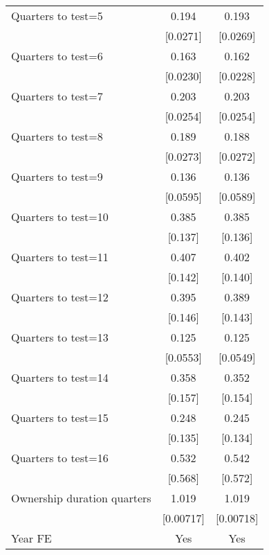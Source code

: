 \begin{longtable}{lcc}
Quarters to test=5  &       0.194\sym{***}&       0.193\sym{***}\tabularnewline
                    &    [0.0271]         &    [0.0269]         \tabularnewline
 
Quarters to test=6  &       0.163\sym{***}&       0.162\sym{***}\tabularnewline
                    &    [0.0230]         &    [0.0228]         \tabularnewline
 
Quarters to test=7  &       0.203\sym{***}&       0.203\sym{***}\tabularnewline
                    &    [0.0254]         &    [0.0254]         \tabularnewline
 
Quarters to test=8  &       0.189\sym{***}&       0.188\sym{***}\tabularnewline
                    &    [0.0273]         &    [0.0272]         \tabularnewline
 
Quarters to test=9  &       0.136\sym{***}&       0.136\sym{***}\tabularnewline
                    &    [0.0595]         &    [0.0589]         \tabularnewline
 
Quarters to test=10 &       0.385\sym{**} &       0.385\sym{**} \tabularnewline
                    &     [0.137]         &     [0.136]         \tabularnewline
 
Quarters to test=11 &       0.407\sym{*}  &       0.402\sym{**} \tabularnewline
                    &     [0.142]         &     [0.140]         \tabularnewline
 
Quarters to test=12 &       0.395\sym{*}  &       0.389\sym{*}  \tabularnewline
                    &     [0.146]         &     [0.143]         \tabularnewline
 
Quarters to test=13 &       0.125\sym{***}&       0.125\sym{***}\tabularnewline
                    &    [0.0553]         &    [0.0549]         \tabularnewline
 
Quarters to test=14 &       0.358\sym{*}  &       0.352\sym{*}  \tabularnewline
                    &     [0.157]         &     [0.154]         \tabularnewline
 
Quarters to test=15 &       0.248\sym{*}  &       0.245\sym{*}  \tabularnewline
                    &     [0.135]         &     [0.134]         \tabularnewline
 
Quarters to test=16 &       0.532         &       0.542         \tabularnewline
                    &     [0.568]         &     [0.572]         \tabularnewline
 
Ownership duration quarters&       1.019\sym{**} &       1.019\sym{**} \tabularnewline
                    &   [0.00717]         &   [0.00718]         \tabularnewline
Year FE             &         Yes         &         Yes         \tabularnewline
 

\end{longtable}
